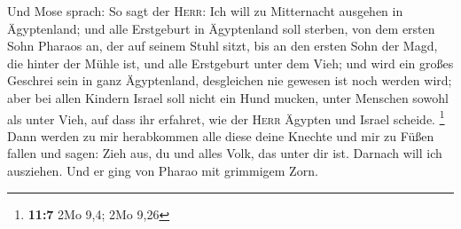  Und Mose sprach: So sagt der \textsc{Herr}: Ich will zu
Mitternacht ausgehen in Ägyptenland;  und alle Erstgeburt
in Ägyptenland soll sterben, von dem ersten Sohn Pharaos an, der auf
seinem Stuhl sitzt, bis an den ersten Sohn der Magd, die hinter der
Mühle ist, und alle Erstgeburt unter dem Vieh;  und wird
ein großes Geschrei sein in ganz Ägyptenland, desgleichen nie gewesen
ist noch werden wird;  aber bei allen Kindern Israel soll
nicht ein Hund mucken, unter Menschen sowohl als unter Vieh, auf dass
ihr erfahret, wie der \textsc{Herr} Ägypten und Israel scheide.
\footnote{\textbf{11:7} 2Mo 9,4; 2Mo 9,26}  Dann werden zu
mir herabkommen alle diese deine Knechte und mir zu Füßen fallen und
sagen: Zieh aus, du und alles Volk, das unter dir ist. Darnach will ich
ausziehen. Und er ging von Pharao mit grimmigem Zorn.

